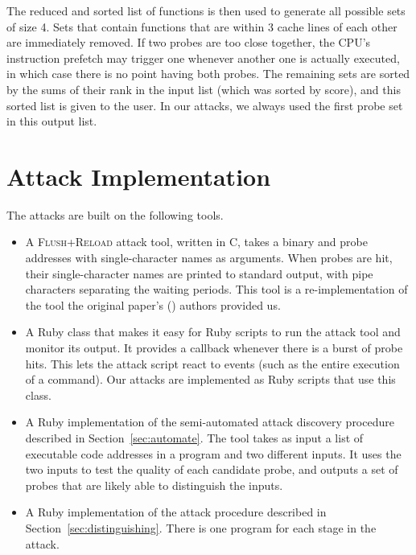 \documentclass[letterpaper,twocolumn,10pt]{article}
\begin{document}

The reduced and sorted list of functions is then used to generate all possible
sets of size 4. Sets that contain functions that are within 3 cache lines of
each other are immediately removed. If two probes are too close together, the
CPU's instruction prefetch may trigger one whenever another
one is actually executed, in which case there is no point having both probes.
The remaining sets are sorted by the sums of their rank in the input list (which
was sorted by score), and this sorted list is given to the user.
In our attacks, we always used the first probe set in this output list.

\section{Attack Implementation}
\label{sec:implementation}

The attacks are built on the following tools.

\begin{itemize}
    \item A \textsc{Flush+Reload} attack tool, written in C, takes a binary and probe
        addresses with single-character names as arguments. When probes are hit,
        their single-character names are printed to standard output, with pipe
        characters separating the waiting periods. This tool is
        a re-implementation of the tool the original paper's
        (\cite{yarom2013flush}) authors provided us.

    \item A Ruby class that makes it easy for Ruby scripts to run the attack
        tool and monitor its output. It provides a callback whenever there is
        a burst of probe hits. This lets the attack script react to events (such
        as the entire execution of a command). Our attacks are implemented as
        Ruby scripts that use this class.

    \item A Ruby implementation of the semi-automated attack discovery procedure
        described in Section~\ref{sec:automate}. The tool takes as input a list
        of executable code addresses in a program and two different inputs. It
        uses the two inputs to test the quality of each candidate probe, and
        outputs a set of probes that are likely able to distinguish the inputs.

    \item A Ruby implementation of the attack procedure described in
          Section~\ref{sec:distinguishing}. There is one program for each stage
          in the attack.
\end{itemize}
\end{document}
